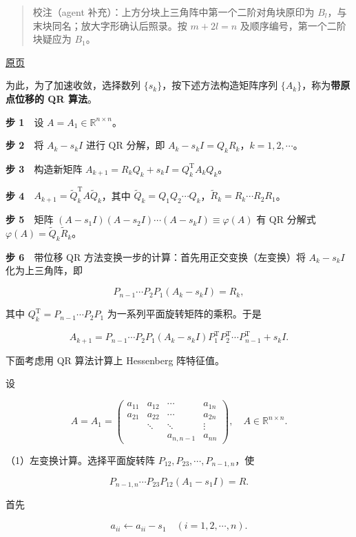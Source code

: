 \documentclass[
  10pt,
  fontset=fandol]{ctexart}
\begin{document}
\begin{quote}
校注（agent 补充）：上方分块上三角阵中第一个二阶对角块原印为 \(B_l\)，与末块同名；放大字形确认后照录。按 \(m+2l=n\) 及顺序编号，第一个二阶块疑应为 \(B_1\)。
\end{quote}

\href{../../source-images/pdf-256.jpeg}{原页}

为此，为了加速收敛，选择数列 \(\{s_k\}\)，按下述方法构造矩阵序列 \(\{A_k\}\)，称为\textbf{带原点位移的 QR 算法}。

\textbf{步 1}　设 \(A=A_1\in\mathbb R^{n\times n}\)。

\textbf{步 2}　将 \(A_k-s_kI\) 进行 QR 分解，即 \(A_k-s_kI=Q_kR_k\)，\(k=1,2,\cdots\)。

\textbf{步 3}　构造新矩阵 \(A_{k+1}=R_kQ_k+s_kI=Q_k^{\mathrm T}A_kQ_k\)。

\textbf{步 4}　\(A_{k+1}=\widetilde Q_k^{\mathrm T}A\widetilde Q_k\)，其中 \(\widetilde Q_k=Q_1Q_2\cdots Q_k\)，\(\widetilde R_k=R_k\cdots R_2R_1\)。

\textbf{步 5}　矩阵 \((A-s_1I)(A-s_2I)\cdots(A-s_kI)\equiv\varphi(A)\) 有 QR 分解式 \(\varphi(A)=\widetilde Q_k\widetilde R_k\)。

\textbf{步 6}　带位移 QR 方法变换一步的计算：首先用正交变换（左变换）将 \(A_k-s_kI\) 化为上三角阵，即

\[
P_{n-1}\cdots P_2P_1(A_k-s_kI)=R_k,
\]

其中 \(Q_k^{\mathrm T}=P_{n-1}\cdots P_2P_1\) 为一系列平面旋转矩阵的乘积。于是

\[
A_{k+1}=P_{n-1}\cdots P_2P_1(A_k-s_kI)P_1^{\mathrm T}P_2^{\mathrm T}\cdots P_{n-1}^{\mathrm T}+s_kI.
\]

下面考虑用 QR 算法计算上 Hessenberg 阵特征值。

设

\[
A=A_1=\begin{pmatrix}
a_{11}&a_{12}&\cdots&a_{1n}\\
a_{21}&a_{22}&\cdots&a_{2n}\\
&\ddots&\ddots&\vdots\\
&&a_{n,n-1}&a_{nn}
\end{pmatrix},\quad A\in\mathbb R^{n\times n}.
\]

（1）左变换计算。选择平面旋转阵 \(P_{12},P_{23},\cdots,P_{n-1,n}\)，使

\[
P_{n-1,n}\cdots P_{23}P_{12}(A_1-s_1I)=R.
\]

首先

\[
a_{ii}\leftarrow a_{ii}-s_1\quad(i=1,2,\cdots,n).
\]
\end{document}
